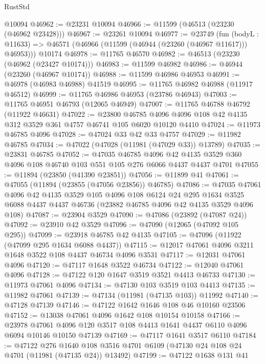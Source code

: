 \begin{lexlean}{RustStd}
\begin{coremodule}
    @10094
@46962 := @23231 @10094
@46966 := @11599 (@46513 (@23230 (@46962 @23428)))
@46967 := @23261 @10094
@46977 := @23749
    (fun (bodyL : @11633) => @46571 (@46966 (@11599 (@46944 (@23260 (@46967 @11617))) @46953)))
    @10174
@46978 := @11765 @46570
@46982 := @46513 (@23230 (@46962 (@23427 @10174)))
@46983 := @11599 @46982
@46986 := @46944 (@23260 (@46967 @10174))
@46988 := @11599 @46986 @46953
@46991 := @46978 (@46983 @46988) @41519
@46995 := @11765 @46982 @46988 (@11917 @46512)
@46999 := @11765 @46986 @46953 (@23786 @46943)
@47003 := @11765 @46951 @46793 (@12065 @46949)
@47007 := @11765 @46788 @46792 (@11922 @46631)
@47022 := @23800
    @46785
    @4096
    @4096
    @108
    @42
    @4135
    @312
    @3529
    @361
    @4757
    @46741
    @105
    @6020
    @10120
    @4410
@47024 := @11973 @46785 @4096
@47028 := @47024 @33 @42 @33 @4757
@47029 := @11982 @46785
@47034 := @47022 (@47028 (@11981 (@47029 @33)) @13789)
@47035 := @23831 @46785
@47052 := @47035
    @46785
    @4096
    @42
    @4135
    @3529
    @360
    @4096
    @108
    @46740
    @103
    @551
    @105
    @276
    @6066
    @4437
    @4437
    @4701
@47055 := @11894 (@23850 (@41390 @23851))
@47056 := @11899 @41
@47061 := @47055 (@11894 (@23855 (@47056 @23856)) @46785)
@47086 := @47035
    @47061
    @4096
    @42
    @4135
    @3529
    @105
    @4096
    @108
    @6124
    @24
    @295
    @1634
    @3525
    @6088
    @4437
    @4437
    @46736
    (@23882 @46785 @4096 @42 @4135 @3529 @4096 @108)
@47087 := @23904 @3529
@47090 := @47086 (@23892 (@47087 @24))
@47092 := @23910 @42 @3529
@47096 := @47090 (@12065 (@47092 @105 @295))
@47099 := @23918 @46785 @42 @4135
@47105 := @47096 (@11922 (@47099 @295 @1634 @6088 @4437))
@47115 := @12017 @47061 @4096 @3211 @1648 @3522 @108 @4437 @46734 @4096 @3531
@47117 := @12031 @47061 @4096
@47120 := @47117 @1648 @3522 @46734
@47122 := @12040 @47061 @4096
@47128 := @47122 @120 @1647 @3519 @3521 @4413 @46733
@47130 := @11973 @47061 @4096
@47134 := @47130 @103 @3519 @103 @4413
@47135 := @11982 @47061
@47139 := @47134 (@11981 (@47135 @103)) @11992
@47140 := @47128 @47139
@47146 := @47122 @1642 @1646 @108 @46 @10160 @23506
@47152 := @13038 @47061 @4096 @1642 @108 @10154 @10158
@47166 := @23978
    @47061
    @4096
    @120
    @3517
    @108
    @4413
    @1641
    @4437
    @6110
    @4096
    @6094
    @10146
    @10150
    @47139
@47169 := @47117 @1641 @3517 @6110
@47184 := @47122
    @276
    @1640
    @108
    @3516
    @4701
    @6109
    (@47130 @24 @108 @24 @4701 (@11981 (@47135 @24)) @13492)
@47199 := @47122
    @1638
    @131
    @41

\end{coremodule}
\end{lexlean}
